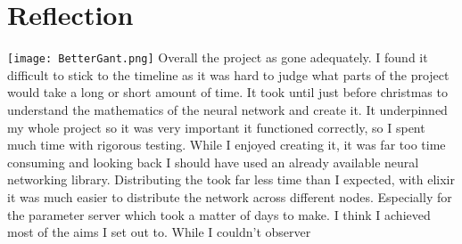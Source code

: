 \section{Reflection}
\texttt{[image: BetterGant.png]}
Overall the project as gone adequately. I found it difficult to stick to the
timeline as it was hard to judge what parts of the project would take a long or
short amount of time. It took until just before christmas to understand the
mathematics of the neural network and create it. It underpinned my whole project
so it was very important it functioned correctly, so I spent much time with
rigorous testing. While I enjoyed creating it, it was far too time consuming and
looking back I should have used an already available neural networking library.
Distributing the took far less time than I expected, with elixir it was much
easier to distribute the network across different nodes. Especially for the
parameter server which took a matter of days to make. I think I achieved most of
the aims I set out to. While I couldn't observer